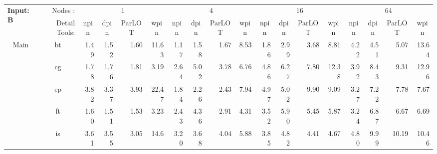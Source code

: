 \begin{table*}[]
\begin{center}
{\begin{tabular}{|c|c|rrrr|rrrr|rrrr|rrrr|}
\hline
\multicolumn{1}{|l|}{\multirow{2}{*}{\textbf{Input: B}}} & \multicolumn{1}{r|}{Nodes :}       & \multicolumn{4}{c|}{1}                                                                                       & \multicolumn{4}{c|}{4}                                                                                       & \multicolumn{4}{c|}{16}                                                                                      & \multicolumn{4}{c|}{64}                                                                                      \\ \cline{2-18} 
\multicolumn{1}{|l|}{}                                   & \multicolumn{1}{r|}{Detail Tools:} & \multicolumn{1}{c}{npin} & \multicolumn{1}{c}{dpin} & \multicolumn{1}{c}{ParLOT} & \multicolumn{1}{c|}{wpin} & \multicolumn{1}{c}{npin} & \multicolumn{1}{c}{dpin} & \multicolumn{1}{c}{ParLOT} & \multicolumn{1}{c|}{wpin} & \multicolumn{1}{c}{npin} & \multicolumn{1}{c}{dpin} & \multicolumn{1}{c}{ParLOT} & \multicolumn{1}{c|}{wpin} & \multicolumn{1}{c}{npin} & \multicolumn{1}{c}{dpin} & \multicolumn{1}{c}{ParLOT} & \multicolumn{1}{c|}{wpin} \\ \hline
\hline
 \multirow{9}{*}{Main} 
 & bt &           1.49 &           1.52 &           1.60 &          11.63 &         1.17 &           1.58 &          1.67 &           8.53 &          1.86 &            2.99 &           3.68 &            8.81 &           4.22 &            4.51 &           5.07 &           13.64 \\
 & cg &           1.78 &           1.76 &          1.81 &           3.19 &         2.64 &           5.02 &          3.78 &           6.76 &          4.86 &            6.27 &            7.80 &           12.38 &           3.92 &            8.43 &           9.31 &           12.96 \\
 & ep &           3.82 &           3.37 &          3.93 &          22.47 &         1.84 &           2.26 &          2.43 &           7.94 &          4.97 &            5.02 &            9.90 &            9.09 &           3.27 &            7.22 &           7.78 &            7.67 \\
 & ft &            1.60 &           1.51 &          1.53 &           3.23 &         2.43 &           4.36 &          2.91 &           4.31 &          3.52 &             5.90 &           5.45 &            5.87 &           3.24 &            6.87 &           6.67 &            6.69 \\
 & is &           3.61 &           3.55 &          3.05 &           14.6 &          3.20 &           3.68 &          4.04 &           5.88 &          3.85 &            4.82 &           4.41 &            4.67 &            4.80 &            9.99 &          10.19 &           10.46 \\

\end{tabular}}
\end{center}
\end{table*}
